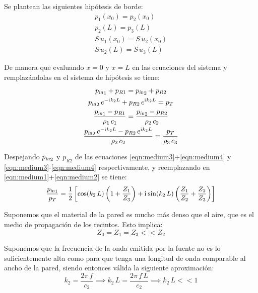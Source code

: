 \documentclass[a5paper,12pt,twoside]{book}
\begin{document}
Se plantean las siguientes hipótesis de borde:
\begin{gather*}
    p_1(x_0) = p_2(x_0)
    \\
    p_2(L) = p_3(L)
    \\
    S \, u_1(x_0) = S \, u_2(x_0)
    \\
    S \, u_2(L) = S \, u_3(L)
\end{gather*}

De manera que evaluando $x=0$ y $x=L$ en las ecuaciones del sistema y remplazándolas en el sistema de hipótesis se tiene:
\begin{gather}
    {{p}_\textsl{{in}}}_1 + p_{R1} = {{p}_\textsl{{in}}}_2 + p_{R2}
    \label{eqn:medium1}
    \\
    {{p}_\textsl{{in}}}_2 \, e^{-\mathrm{i}\mkern1mu k_2 L} + p_{R2} \, e^{\mathrm{i}\mkern1mu k_2 L} = p_T
    \label{eqn:medium2}
    \\
    \frac{{{p}_\textsl{{in}}}_1 - p_{R1}}{\rho_1 \, c_1} = \frac{{{p}_\textsl{{in}}}_2 - p_{R2}}{\rho_2 \, c_2}
    \label{eqn:medium3}
    \\
    \frac{{{p}_\textsl{{in}}}_2 \, e^{-\mathrm{i}\mkern1mu k_2 L} - p_{R2} \, e^{\mathrm{i}\mkern1mu k_2 L}}{\rho_2 \, c_2} = \frac{p_T}{\rho_3 \, c_3}
    \label{eqn:medium4}
\end{gather}

Despejando ${{p}_\textsl{{in}}}_2$ y $p_{R2}$ de las ecuaciones \ref{eqn:medium3}+\ref{eqn:medium4} y \ref{eqn:medium3}-\ref{eqn:medium4} respectivamente, y reemplazando en \ref{eqn:medium1}+\ref{eqn:medium2} se tiene:
\begin{equation}
    \scale{0.96}
    {
    \frac{\sub{p}{in}_1}{p_T} = \frac{1}{2} \left[ \cos(k_2 \, L) \left( 1+\frac{Z_1}{Z_3} \right) + \iu \sin(k_2 \, L) \left( \frac{Z_1}{Z_2} + \frac{Z_2}{Z_3} \right) \right]
    }
    \label{eqn:mediumPin/PT}
\end{equation}

Suponemos que el material de la pared es mucho más denso que el aire, que es el medio de propagación de los recintos.
Esto implica:
\begin{equation*}
    Z_0 = Z_1 = Z_3 << Z_2
\end{equation*}

Suponemos que la frecuencia de la onda emitida por la fuente no es lo suficientemente alta como para que tenga una longitud de onda comparable al ancho de la pared, siendo entonces válida la siguiente aproximación:
\begin{equation*}
    k_2 = \frac{2\pi \, f}{c_2}
    \implies k_2 \, L = \frac{2\pi \, f \, L}{c_2}
    \implies k_2 \, L << 1
\end{equation*}
\end{document}
